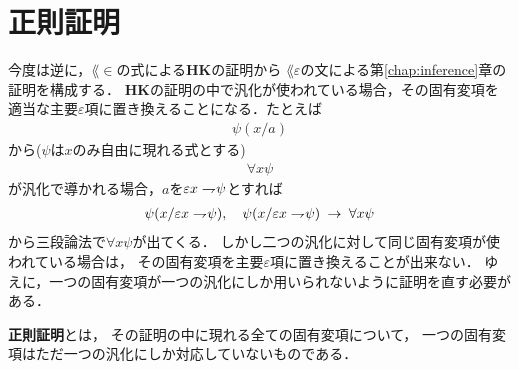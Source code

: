 \section{正則証明}
	今度は逆に，$\lang{\in}$の式による{\bf HK}の証明から
	$\lang{\varepsilon}$の文による第\ref{chap:inference}章の証明を構成する．
	{\bf HK}の証明の中で汎化が使われている場合，その固有変項を
	適当な主要$\varepsilon$項に置き換えることになる．たとえば
	\begin{align}
		\psi(x/a)
	\end{align}
	から($\psi$は$x$のみ自由に現れる式とする)
	\begin{align}
		\forall x \psi
	\end{align}
	が汎化で導かれる場合，$a$を$\varepsilon x \rightharpoondown\hspace{-0.25em} \psi$とすれば
	\begin{align}
		\psi(x/\varepsilon x \rightharpoondown\hspace{-0.25em} \psi), 
		\quad \psi(x/\varepsilon x \rightharpoondown\hspace{-0.25em} \psi) \hspace{0.25em}\rightarrow\hspace{0.25em} \forall x \psi
	\end{align}
	から三段論法で$\forall x \psi$が出てくる．
	しかし二つの汎化に対して同じ固有変項が使われている場合は，
	その固有変項を主要$\varepsilon$項に置き換えることが出来ない．
	ゆえに，一つの固有変項が一つの汎化にしか用いられないように証明を直す必要がある．
	
	\begin{screen}
		\begin{metadfn}[正則証明]
			{\bf 正則証明}とは，
			その証明の中に現れる全ての固有変項について，
			一つの固有変項はただ一つの汎化にしか対応していないものである．
		\end{metadfn}
	\end{screen}
	
	\begin{screen}
		\begin{metathm}[どんな証明も正則化できる]
			
		\end{metathm}
	\end{screen}
	
